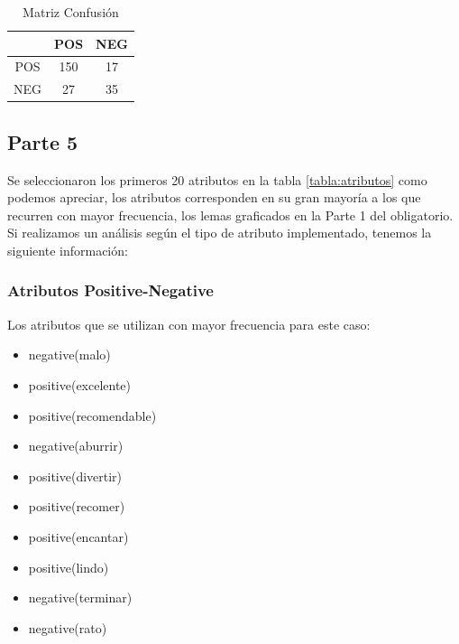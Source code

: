 \documentclass[12pt]{article}
\begin{document}
\begin{table}[!htb]
\begin{center}
\begin{tabular}{|c|c|c|} 
\cline{2-3}
 \multicolumn{1}{l}{}&
 \multicolumn{1}{|l}{POS}&
 \multicolumn{1}{|l|}{NEG}
\tabularnewline
  \hline
  POS & 150 & 17 \\ \hline
  NEG & 27 & 35 \\ \hline
\end{tabular} 
\end{center}
\caption{Matriz Confusión} 
\label{tabla:matrix}
\end{table}

\subsection{Parte 5}
Se seleccionaron los primeros 20 atributos en la tabla \ref{tabla:atributos} como podemos apreciar, los atributos corresponden en su gran mayoría a los que recurren con mayor frecuencia, los lemas graficados en la Parte 1 del obligatorio. Si realizamos un análisis según el tipo de atributo implementado, tenemos la siguiente información:
\subsubsection{Atributos Positive-Negative}
Los atributos que se utilizan con mayor frecuencia para este caso:
\begin{itemize}
  \item negative(malo)
  \item positive(excelente)
  \item positive(recomendable)
  \item negative(aburrir)
  \item positive(divertir)
  \item positive(recomer)
  \item positive(encantar)
  \item positive(lindo)
  \item negative(terminar)
  \item negative(rato)
\end{itemize}
\end{document}
